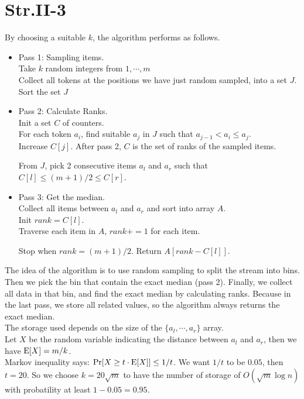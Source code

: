 \section*{Str.II-3}
By choosing a suitable $k$, the algorithm performs as follows.

\begin{itemize}
    \item Pass 1: Sampling items. \\

      Take $k$ random integers from ${1, \cdots, m}$ \\

    Collect all tokens at the positions we have just random sampled, into a set $J$. \\

    Sort the set $J$

    \item Pass 2: Calculate Ranks. \\

      Init a set $C$ of counters. \\

      For each token $a_i$, find suitable $a_j$ in $J$ such that $a_{j-1} < a_i \leq a_j$.\\

      Increase $C[j]$. After pass 2, $C$ is the set of ranks of the sampled items.

      From $J$, pick 2 consecutive items $a_l$ and $a_r$ such that $C[l] \leq (m + 1) / 2 \leq C[r]$.

    \item Pass 3: Get the median. \\

      Collect all items between $a_l$ and $a_r$ and sort into array $A$.\\

      Init $rank = C[l]$.\\ 
      
      Traverse each item in $A$, $rank += 1$ for each item. 

      Stop when $rank = (m + 1) / 2$. Return $A[rank - C[l]]$.
  \end{itemize}

  The idea of the algorithm is to use random sampling to split the stream into bins. Then we pick the bin that contain the exact median (pass 2). Finally, we collect all data in that bin, and find the exact median by calculating ranks. Because in the last pass, we store all related values, so the algorithm always returns the exact median. \\

   The storage used depends on the size of the $\{a_l,\cdots, a_r\}$ array.\\ 

  Let $X$ be the random variable indicating the distance between $a_l$ and $a_r$, then we have $\operatorname{E}[X] = m/k$. \\

 Markov inequality says: $\Pr[X \geq t \cdot \operatorname{E}[X]] \leq 1/t$. We want $1/t$ to be $0.05$, then $t = 20$. So we choose $k = 20 \sqrt{m}$ to have the number of storage of $O(\sqrt{m} \log n)$ with probatility at least $1 - 0.05 = 0.95$.\\
